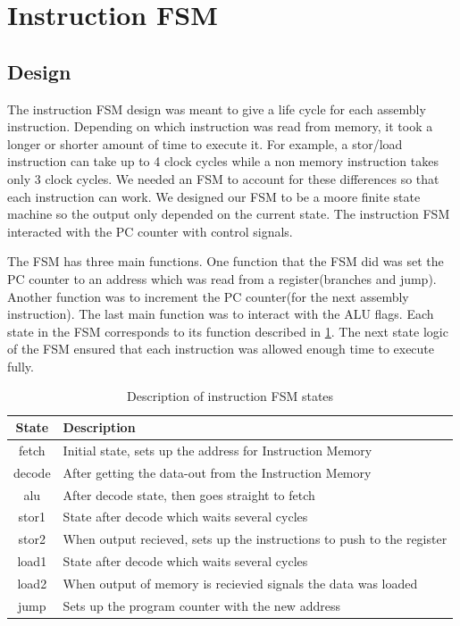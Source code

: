 \documentclass[letterpaper, 11 pt, conference]{article}
\begin{document}
\section{Instruction FSM}
\subsection{Design}
The instruction FSM design was meant to give a life cycle for each assembly instruction. Depending on which instruction was read from memory, it took a longer or shorter amount of time to execute it. For example, a stor/load instruction can take up to 4 clock cycles while a non memory instruction takes only 3 clock cycles. We needed an FSM to account for these differences so that each instruction can work. We designed our FSM to be a moore finite state machine so the output only depended on the current state. The instruction FSM interacted with the PC counter with control signals.

The FSM has three main functions. One function that the FSM did was set the PC counter to an address which was read from a register(branches and jump). Another function was to increment the PC counter(for the next assembly instruction). The last main function was to interact with the ALU flags. Each state in the FSM corresponds to its function described in \ref{table:state}. The next state logic of the FSM ensured that each instruction was allowed enough time to execute fully.

\begin{table}
\centering
\caption{Description of instruction FSM states}
\begin{tabular}{|c|p{4in}|}
\hline
State & Description \\
\hline
fetch & Initial state, sets up the address for Instruction Memory \\
decode & After getting the data-out from the Instruction Memory \\
alu & After decode state, then goes straight to fetch \\
stor1 & State after decode which waits several cycles \\
stor2 & When output recieved, sets up the instructions to push to the register \\
load1 & State after decode which waits several cycles \\
load2 &  When output of memory is recievied signals the data was loaded \\
jump & Sets up the program counter with the new address \\
\hline
\end{tabular}
\label{table:state}
\end{table}
\end{document}
